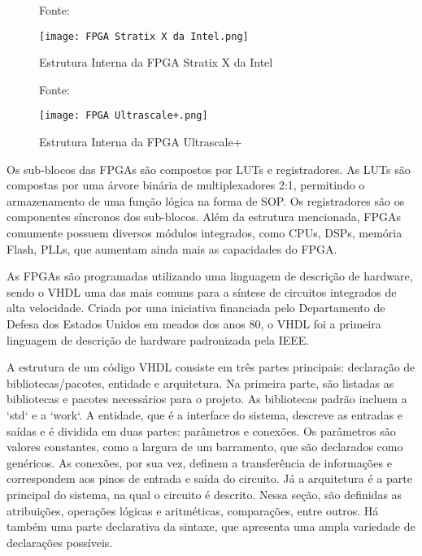 \begin{figure}[h!]
    \centering
    \captionsetup{justification=centering}
    \caption*{Fonte: \cite{Pedroni2010}}
    \texttt{[image: FPGA Stratix X da Intel.png]}
    \caption{Estrutura Interna da FPGA Stratix X da Intel}
    \label{fig:Stratix}
\end{figure}

\begin{figure}[htbp!]
    \centering
    \captionsetup{justification=centering}
    \caption*{Fonte: \cite{Pedroni2010}}
    \texttt{[image: FPGA Ultrascale+.png]}
    \caption{Estrutura Interna da FPGA Ultrascale+}
    \label{fig:Ultrascale}
\end{figure}

Os sub-blocos das FPGAs são compostos por LUTs e registradores. As LUTs são compostas por uma árvore binária de multiplexadores 2:1, permitindo o armazenamento de uma função lógica na forma de SOP. Os registradores são os componentes síncronos dos sub-blocos. Além da estrutura mencionada, FPGAs comumente possuem diversos módulos integrados, como CPUs, DSPs, memória Flash, PLLs, que aumentam ainda mais as capacidades do FPGA.

As FPGAs são programadas utilizando uma linguagem de descrição de hardware, sendo o VHDL uma das mais comuns para a síntese de circuitos integrados de alta velocidade. Criada por uma iniciativa financiada pelo Departamento de Defesa dos Estados Unidos em meados dos anos 80, o VHDL foi a primeira linguagem de descrição de hardware padronizada pela IEEE.

A estrutura de um código VHDL consiste em três partes principais: declaração de bibliotecas/pacotes, entidade e arquitetura. Na primeira parte, são listadas as bibliotecas e pacotes necessários para o projeto. As bibliotecas padrão incluem a `std` e a `work`. A entidade, que é a interface do sistema, descreve as entradas e saídas e é dividida em duas partes: parâmetros e conexões. Os parâmetros são valores constantes, como a largura de um barramento, que são declarados como genéricos. As conexões, por sua vez, definem a transferência de informações e correspondem aos pinos de entrada e saída do circuito. Já a arquitetura é a parte principal do sistema, na qual o circuito é descrito. Nessa seção, são definidas as atribuições, operações lógicas e aritméticas, comparações, entre outros. Há também uma parte declarativa da sintaxe, que apresenta uma ampla variedade de declarações possíveis.


